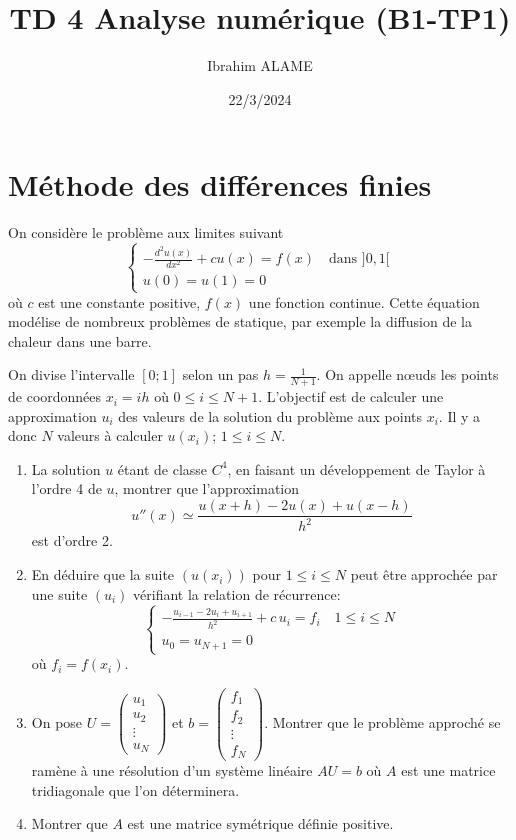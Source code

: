 \documentclass[a4paper]{article}
\title{TD 4 Analyse numérique (B1-TP1)}
\author{Ibrahim ALAME}
\date{22/3/2024}
\begin{document}
\maketitle



\section{Méthode des différences finies}
 On considère le problème aux limites suivant
\[\left\{\begin{array}{l}
-\frac{d^2u(x)}{dx^2}+c u(x)=f(x)\quad\mbox{dans }]0,1[\\
u(0)=u(1)=0
\end{array}\right.
\]
où $c$ est une constante positive, $f(x)$ une fonction continue. Cette équation modélise de nombreux problèmes de statique, par exemple la diffusion de la chaleur dans une barre.

On divise l'intervalle $[0; 1]$ selon un pas $h = \frac 1{N+1}$. On appelle nœuds les points de coordonnées $x_i = ih$ où $0\leq i\leq N+1$. L'objectif est de calculer une approximation $u_i$ des valeurs de la solution du problème aux points $x_i$. Il y a donc $N$ valeurs à calculer $u(x_i)$;  $1\leq i\leq N$. 

\begin{enumerate}
\item La solution $u$ étant de classe $C^4$, en faisant un développement de Taylor à l'ordre 4 de $u$, montrer que l'approximation 
\[u''(x)\simeq \frac{u(x+h)-2u(x)+u(x-h)}{h^2}\] 
 est  d'ordre 2. 

\item En déduire que la suite $(u(x_i))$ pour $1\leq i\leq N$ peut être approchée par une suite $(u_i)$ vérifiant la relation de récurrence:
\[\left\{\begin{array}{l}
\displaystyle -\frac{u_{i-1}-2u_i+u_{i+1}}{h^2}+c\,u_i =f_i \quad1\leq i\leq N\\
u_0=u_{N+1}=0
\end{array}\right.
\]
où  $f_i=f(x_i)$.
\item On pose $U=\left(\begin{array}{c} u_1\\ u_2 \\ \vdots \\ u_N \end{array}\right)$ et $b=\left(\begin{array}{c} f_1\\ f_2 \\ \vdots \\ f_N \end{array}\right)$. Montrer que le problème approché se ramène à une résolution d'un système linéaire $A U = b$ où $A$ est une matrice tridiagonale que l'on déterminera.
\item Montrer que $A$ est une matrice symétrique définie positive.

\end{enumerate}
\end{document}
